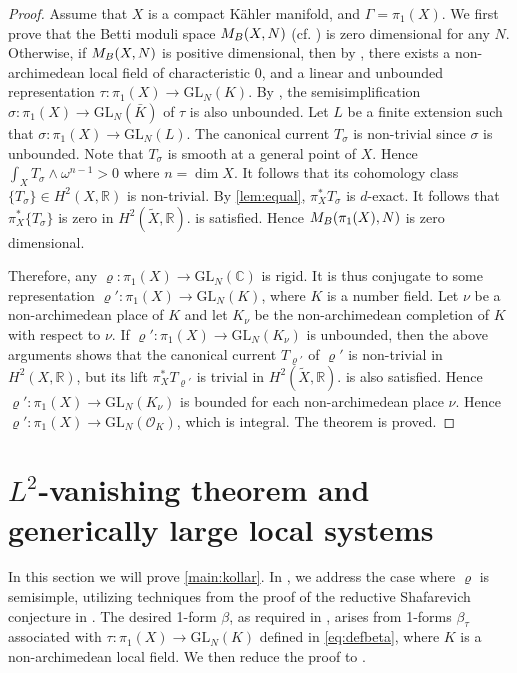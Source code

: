 \documentclass[11pt,a4paper,english]{smfart}
\theoremstyle{plain}
\theoremstyle{definition}
\theoremstyle{plain}
\newcommand\GL{\mathrm{GL}}
\def\bR{\mathbb{R}}
\def\bC{\mathbb{C}}
\def\cO{\mathcal{O}}
\begin{document}
	\begin{proof}
		Assume that $X$ is a compact Kähler manifold, and $\Gamma=\pi_1(X)$. We first prove that the Betti moduli space $M_{\rm B}(X,N)$ (cf. \cite{Sim94}) is zero dimensional for any $N$. Otherwise, if $M_{\rm B}(X,N)$ is positive dimensional, then by \cite{Yam10}, there exists a non-archimedean local field of characteristic 0, and a linear and unbounded representation $\tau:\pi_1(X)\to \GL_N(K)$. By \cite{DY23}, the semisimplification $\sigma:\pi_1(X)\to \GL_N(\bar{K})$ of $\tau$ is also unbounded.  Let $L$ be a finite extension such that $\sigma:\pi_1(X)\to \GL_N(L)$. The canonical current $T_\sigma$ is non-trivial since $\sigma$ is unbounded.   Note that $T_\sigma$ is smooth at a general point of $X$. Hence $\int_{X}T_\sigma\wedge \omega^{n-1}>0$ where $n=\dim X$.  It follows that its cohomology class $\{T_{\sigma}\}\in H^2(X,\bR)$ is non-trivial.  By \cref{lem:equal}, $\pi_X^*T_\sigma$ is $d$-exact. It follows that $\pi_X^*\{T_\sigma\}$ is zero in $H^2(\widetilde{X},\bR)$.   is satisfied. Hence $M_{\rm B}(\pi_1(X),N)$ is zero dimensional. 
		
		Therefore, any $\varrho:\pi_1(X)\to \GL_N(\bC)$ is rigid. It is thus conjugate to some representation $\varrho':\pi_1(X)\to \GL_N(K)$, where $K$ is a number field. Let $\nu$ be a non-archimedean place of $K$ and let $K_\nu$ be the non-archimedean completion of $K$ with respect to $\nu$. If $\varrho':\pi_1(X)\to \GL_N(K_\nu)$ is unbounded, then the above arguments shows that the canonical current $T_{\varrho'}$ of $\varrho'$ is non-trivial in $H^2(X,\bR)$, but its lift  $\pi_X^*T_{\varrho'}$ is trivial in $H^2(\widetilde{X},\bR)$.  is also satisfied. Hence $\varrho':\pi_1(X)\to \GL_N(K_\nu)$ is  bounded  for each non-archimedean place  $\nu$.  Hence $\varrho':\pi_1(X)\to \GL_N(\cO_K)$, which is integral.   The theorem is proved.  
	\end{proof}
	\fi
	
	\section{$L^2$-vanishing theorem and generically large  local systems}\label{sec:linear}
 In this section we will prove \cref{main:kollar}.  In ,   we address the case where $\varrho$ is semisimple, utilizing techniques from the proof of the reductive Shafarevich conjecture in   \cite{Eys04,DY23}.  The desired 1-form $\beta$, as required in ,  arises from   1-forms $\beta_\tau$ associated with $\tau:\pi_1(X)\to \GL_N(K)$ defined in \eqref{eq:defbeta}, where $K$ is a non-archimedean local field.   We then reduce the proof   to .
	
\end{document}
